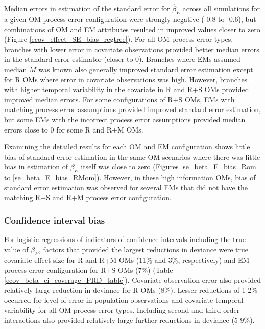 \documentclass[
  12pt,
]{article}
\begin{document}
Median errors in estimation of the standard error for \(\widehat \beta_E\) across all simulations for a given OM process error configuration were strongly negative (-0.8 to -0.6), but combinations of OM and EM attributes resulted in improved values closer to zero (Figure \ref{ecov_effect_SE_bias_regtree}). For all OM process error types, branches with lower error in covariate observations provided better median errors in the standard error estimator (closer to 0). Branches where EMs assumed median \(M\) was known also generally improved standard error estimation except for R OMs where error in covariate observations was high. However, branches with higher temporal variability in the covariate in R and R+S OMs provided improved median errors. For some configurations of R+S OMs, EMs with matching process error assumptions provided improved standard error estimation, but some EMs with the incorrect process error assumptions provided median errors close to 0 for some R and R+M OMs.

Examining the detailed results for each OM and EM configuration shows little bias of standard error estimation in the same OM scenarios where there was little bias in estimation of \(\beta_E\) itself was close to zero (Figures \ref{se_beta_E_bias_Rom} to \ref{se_beta_E_bias_RMom}). However, in these high information OMs, bias of standard error estimation was observed for several EMs that did not have the matching R+S and R+M process error configuration.

\subsubsection*{Confidence interval bias}\label{confidence-interval-bias}

For logistic regressions of indicators of confidence intervals including the true value of \(\beta_E\), factors that provided the largest reductions in deviance were true covariate effect size for R and R+M OMs (11\% and 3\%, respectively) and EM process error configuration for R+S OMs (7\%) (Table \ref{ecov_beta_ci_coverage_PRD_table}). Covariate observation error also provided relatively large reduction in deviance for R OMs (8\%). Lesser reductions of 1-2\% occurred for level of error in population observations and covariate temporal variability for all OM process error types. Including second and third order interactions also provided relatively large further reductions in deviance (5-9\%).
\end{document}
